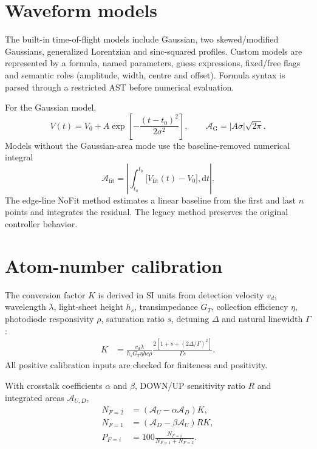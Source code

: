 \documentclass[11pt,oneside,openany]{book}
\begin{document}
\section{Waveform models}
The built-in time-of-flight models include Gaussian, two skewed/modified Gaussians,
generalized Lorentzian and sinc-squared profiles. Custom models are represented by a
formula, named parameters, guess expressions, fixed/free flags and semantic roles
(amplitude, width, centre and offset). Formula syntax is parsed through a restricted AST
before numerical evaluation.

For the Gaussian model,
\begin{equation}
  V(t)=V_0+A\exp\!\left[-\frac{(t-t_0)^2}{2\sigma^2}\right],
  \qquad
  \mathcal{A}_{\mathrm{G}}=|A\sigma|\sqrt{2\pi}.
\end{equation}
Models without the Gaussian-area mode use the baseline-removed numerical integral
\begin{equation}
  \mathcal{A}_{\mathrm{fit}}=\left|\int_{t_a}^{t_b}
  \bigl[V_{\mathrm{fit}}(t)-V_0\bigr],\mathrm{d}t\right|.
\end{equation}
The edge-line NoFit method estimates a linear baseline from the first and last $n$ points
and integrates the residual. The legacy method preserves the original controller behavior.

\section{Atom-number calibration}
The conversion factor $K$ is derived in SI units from detection velocity $v_d$, wavelength
$\lambda$, light-sheet height $h_s$, transimpedance $G_T$, collection efficiency $\eta$,
photodiode responsivity $\rho$, saturation ratio $s$, detuning $\Delta$ and natural
linewidth $\Gamma$:
\begin{align}
  K &= \frac{v_d\lambda}{h_sG_T\eta h c\rho}
  \frac{2\left[1+s+(2\Delta/\Gamma)^2\right]}{\Gamma s}.
\end{align}
All positive calibration inputs are checked for finiteness and positivity.

With crosstalk coefficients $\alpha$ and $\beta$, DOWN/UP sensitivity ratio $R$ and
integrated areas $\mathcal{A}_{U,D}$,
\begin{align}
  N_{F=2} &= (\mathcal{A}_U-\alpha\mathcal{A}_D)K,\\
  N_{F=1} &= (\mathcal{A}_D-\beta\mathcal{A}_U)RK,\\
  P_{F=i} &= 100\frac{N_{F=i}}{N_{F=1}+N_{F=2}}.
\end{align}
\end{document}
